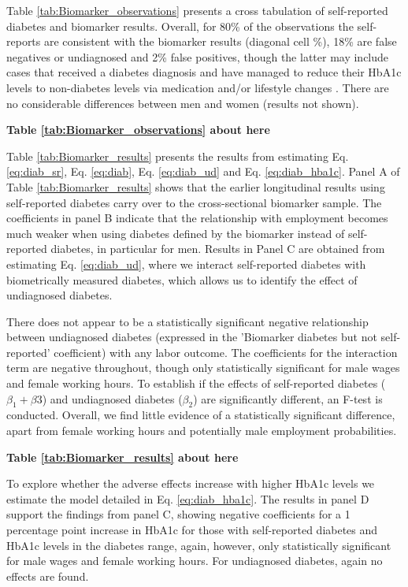\documentclass[12pt,english]{article}
\begin{document}
Table \ref{tab:Biomarker_observations} presents a cross tabulation of self-reported diabetes and biomarker results. Overall, for 80\% of the observations the self-reports are consistent with the biomarker results (diagonal cell \%), 18\% are false negatives or undiagnosed and 2\% false positives, though the latter may include cases that received a diabetes diagnosis and have managed to reduce their \ac{HbA1c} levels to non-diabetes levels via medication and/or lifestyle changes \parencite{Flores-Hernandez2015}.  There are no considerable differences between men and women (results not shown). 

\begin{center}
	\textbf{Table \ref{tab:Biomarker_observations} about here}
\end{center}


Table \ref{tab:Biomarker_results} presents the results from estimating Eq. \ref{eq:diab_sr}, Eq. \ref{eq:diab}, Eq. \ref{eq:diab_ud} and Eq. \ref{eq:diab_hba1c}. Panel A of Table \ref{tab:Biomarker_results} shows that the earlier longitudinal results using self-reported diabetes carry over to the cross-sectional biomarker sample. The coefficients in panel B indicate that the relationship with employment becomes much weaker when using diabetes defined by the biomarker instead of self-reported diabetes, in particular for men. Results in Panel C are obtained from estimating Eq. \ref{eq:diab_ud}, where we interact self-reported diabetes with biometrically measured diabetes, which allows us to identify the effect of undiagnosed diabetes. 

There does not appear to be a statistically significant negative relationship between undiagnosed diabetes (expressed in the 'Biomarker diabetes but not self-reported' coefficient) with any labor outcome. The coefficients for the interaction term are negative throughout, though only statistically significant for male wages and female working hours. To establish if the effects of self-reported diabetes ($\beta_{1} + \beta{3}$) and undiagnosed diabetes ($\beta_{2}$) are significantly different, an F-test is conducted. Overall, we find little evidence of a statistically significant difference, apart from female working hours and potentially male employment probabilities.

\begin{center}
	\textbf{Table \ref{tab:Biomarker_results} about here}
\end{center}


To explore whether the adverse effects increase with higher  \ac{HbA1c} levels we estimate the model detailed in Eq. \ref{eq:diab_hba1c}. The results in panel D support the findings from panel C, showing negative coefficients for a 1 percentage point increase in \ac{HbA1c} for those with self-reported diabetes and \ac{HbA1c} levels in the diabetes range, again, however, only statistically significant for male wages and female working hours. For undiagnosed diabetes, again no effects are found.
\end{document}

